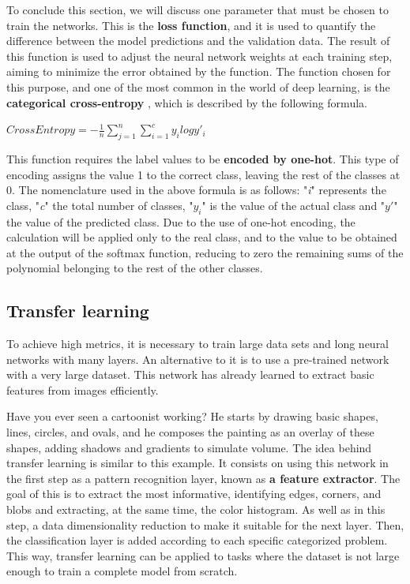 To conclude this section, we will discuss one parameter that must be chosen to train the networks. This is the \textbf{loss function}, and it is used to quantify the difference between the model predictions and the validation data. The result of this function is used to adjust the neural network weights at each training step, aiming to minimize the error obtained by the function. The function chosen for this purpose, and one of the most common in the world of deep learning, is the \textbf{categorical cross-entropy} \cite{alberto_funciones_2021}, which is described by the following formula. 

\hspace{3cm}

\hspace{5cm} $CrossEntropy = - \frac{1}{n} \sum_{j=1}^{n} \sum_{i=1}^{c} y_i log y'_i$

\hspace{3cm}

This function requires the label values to be \textbf{encoded by one-hot}. This type of encoding assigns the value 1 to the correct class, leaving the rest of the classes at 0. The nomenclature used in the above formula is as follows: "\textit{i}" represents the class, "\textit{c}" the total number of classes, "\textit{$y_i$}" is the value of the actual class and "\textit{$y'$}" the value of the predicted class. Due to the use of one-hot encoding, the calculation will be applied only to the real class, and to the value to be obtained at the output of the softmax function, reducing to zero the remaining sums of the polynomial belonging to the rest of the other classes.  



\subsection{Transfer learning}

To achieve high metrics, it is necessary to train large data sets and long neural networks with many layers. An alternative to it is to use a pre-trained network with a very large dataset. This network has already learned to extract basic features from images efficiently. 

Have you ever seen a cartoonist working? He starts by drawing basic shapes, lines, circles, and ovals, and he composes the painting as an overlay of these shapes, adding shadows and gradients to simulate volume. The idea behind transfer learning is similar to this example. It consists on using this network in the first step as a pattern recognition layer, known as \textbf{a feature extractor}. The goal of this is to extract the most informative, identifying edges, corners, and blobs and extracting, at the same time, the color histogram.  As well as in this step, a data dimensionality reduction to make it suitable for the next layer. Then, the classification layer is added according to each specific categorized problem. This way, transfer learning can be applied to tasks where the dataset is not large enough to train a complete model from scratch.

